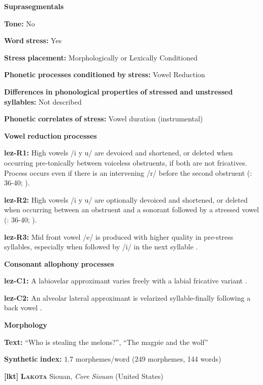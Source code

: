 \textbf{Suprasegmentals}

\textbf{Tone:} No

\textbf{Word} \textbf{stress:} Yes

\textbf{Stress} \textbf{placement:} Morphologically or Lexically Conditioned

\textbf{Phonetic} \textbf{processes} \textbf{conditioned} \textbf{by} \textbf{stress:} Vowel Reduction

\textbf{Differences} \textbf{in} \textbf{phonological} \textbf{properties} \textbf{of} \textbf{stressed} \textbf{and} \textbf{unstressed} \textbf{syllables:} Not described

\textbf{Phonetic} \textbf{correlates} \textbf{of} \textbf{stress:} Vowel duration (instrumental)

\textbf{Vowel} \textbf{reduction} \textbf{processes}

\textbf{lez-R1:} High vowels /i y u/ are devoiced and shortened, or deleted when occurring pre-tonically between voiceless obstruents, if both are not fricatives. Process occurs even if there is an intervening /r/ before the second obstruent (\citealt{Haspelmath1993}: 36-40; \citealt{ChitoranBabaliyeva2007}).

\textbf{lez-R2:} High vowels /i y u/ are optionally devoiced and shortened, or deleted when occurring between an obstruent and a sonorant followed by a stressed vowel (\citealt{Haspelmath1993}: 36-40; \citealt{ChitoranBabaliyeva2007}).

\textbf{lez-R3:} Mid front vowel /e/ is produced with higher quality in pre-stress syllables, especially when followed by /i/ in the next syllable \citep[32]{Haspelmath1993}.

\textbf{Consonant} \textbf{allophony} \textbf{processes}

\textbf{lez-C1:} A labiovelar approximant varies freely with a labial fricative variant \citep[35]{Haspelmath1993}.

\textbf{lez-C2:} An alveolar lateral approximant is velarized syllable-finally following a back vowel \citep[35]{Haspelmath1993}.

\textbf{Morphology}

\textbf{Text:} “Who is stealing the melons?”, “The magpie and the wolf” \citep[448-456]{Haspelmath1993}

\textbf{Synthetic} \textbf{index:} 1.7 morphemes/word (249 morphemes, 144 words)

\textbf{[lkt]}   \textbf{\textsc{Lakota}}    Siouan, \textit{Core} \textit{Siouan} (United States)

